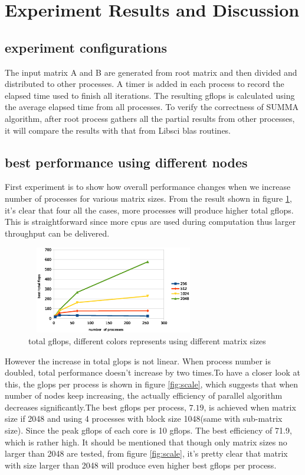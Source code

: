 \documentclass{ics-paper}
\begin{document}
\section{Experiment Results and Discussion}
\subsection{experiment configurations}
The input matrix A and B are generated from root matrix and then divided and distributed to other processes. A timer is added in each process to record the elapsed time used to finish all iterations. The resulting gflops is calculated using the average elapsed time from all processes. To verify the correctness of SUMMA algorithm, after root process gathers all the partial results from other processes, it will compare the results with that from Libsci blas routines.
\subsection{best performance using different nodes}

First experiment is to show how overall performance changes when we increase number of processes for various matrix sizes. From the result shown in figure \ref{fig:totalflops}, it's clear that four all the cases, more processes will produce higher total gflops. This is straightforward since more cpus are used during computation thus larger throughput can be delivered.
\begin{figure}
	\includegraphics[height=1.5in, width=3in]{total_flops}
	\caption{total gflops, different colors represents using different matrix sizes}
	\label{fig:totalflops}
\end{figure}
However the increase in total glops is not linear. When process number is doubled, total performance doesn't increase by two times.To have a closer look at this, the glops per process is shown in figure \ref{fig:scale}, which suggests that when number of nodes keep increasing, the actually efficiency of parallel algorithm decreases significantly.The best gflops per process, $7.19$, is achieved when matrix size if 2048 and using 4 processes with block size 1048(same with sub-matrix size). Since the peak gflops of each core is 10 gflops. The best efficiency of 71.9, which is rather high. It should be mentioned that though only matrix sizes no larger than 2048 are tested, from figure \ref{fig:scale}, it's pretty clear that matrix with size larger than 2048 will produce even higher best gflops per process.
\end{document}
